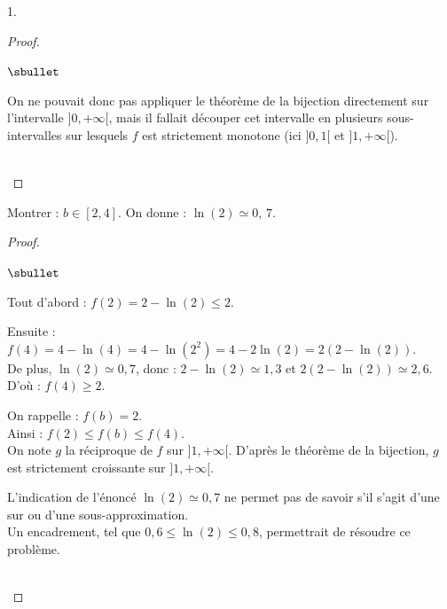 \documentclass[11pt]{article}%
\begin{document}
\begin{noliste}{1.}
\begin{proof}
\begin{remark}
\begin{noliste}{$\sbullet$}
	\item On ne pouvait donc pas appliquer le théorème de la 
	bijection directement sur l'intervalle $]0,+\infty[$, mais il 
	fallait découper cet intervalle en plusieurs 
	sous-intervalles sur lesquels $f$ est strictement 
	monotone (ici $]0,1[$ et $]1,+\infty[$).
      \end{noliste}
    \end{remark}~\\[-1.4cm]
  \end{proof}

  
\item Montrer : $b \in [2,4]$. On donne : $\ln(2) \simeq 0, \, 7$.
  
  \begin{proof}~
    \begin{noliste}{$\sbullet$}
      \item Tout d'abord : $f(2) = 2-\ln(2) \leq 2$.
      \item Ensuite : $f(4) = 4-\ln(4) = 4 - \ln(2^2) = 4 -2\ln(2) =
      2(2-\ln(2))$.\\
      De plus, $\ln(2) \simeq 0,7$, donc : $2-\ln(2) \simeq 1,3$
      et $2(2-\ln(2)) \simeq 2,6$.\\
      D'où : $f(4) \geq 2$.
      
      \item On rappelle : $f(b)=2$.\\
      Ainsi : $f(2) \leq f(b) \leq f(4)$.\\
      On note $g$ la réciproque de $f$ sur $]1,+\infty[$. D'après le 
      théorème de la bijection, $g$ est strictement croissante sur 
      $]1,+\infty[$.
    \end{noliste}
    
    \begin{remark}
      L'indication de l'énoncé $\ln(2) \simeq 0,7$ ne permet pas de 
      savoir s'il s'agit d'une sur ou d'une sous-approximation.\\
      Un encadrement, tel que $0,6 \leq \ln(2) \leq 0,8$, 
      permettrait de résoudre ce problème.
    \end{remark}~\\[-1.4cm]
  \end{proof}
\end{noliste}
\end{document}

